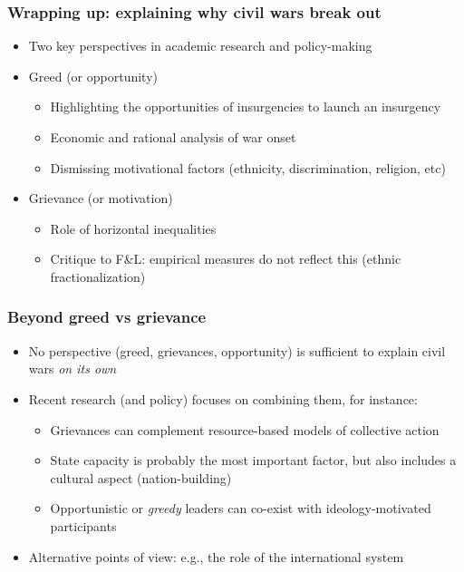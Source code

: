 \documentclass[utf8, xcolor=dvipsnames]{beamer}
\begin{document}
\begin{frame}
\frametitle{Wrapping up: explaining why civil wars break out}
\centering

\begin{itemize}
  \item<1-> Two key perspectives in academic research and policy-making
  \item<2-> Greed (or opportunity)
    \begin{itemize}
      \item Highlighting the opportunities of insurgencies to launch an insurgency
      \item Economic and rational analysis of war onset
      \item Dismissing motivational factors (ethnicity, discrimination, religion, etc)
    \end{itemize}
  \item<3-> Grievance (or motivation)
  \begin{itemize}
    \item Role of horizontal inequalities
    \item Critique to F\&L: empirical measures do not reflect this (ethnic fractionalization)
  \end{itemize}
\end{itemize}

\end{frame}

\begin{frame}
\frametitle{Beyond greed vs grievance}
\centering

\begin{itemize}[<+->]
  \item No perspective (greed, grievances, opportunity) is sufficient to explain civil wars \textit{on its own}
  \item Recent research (and policy) focuses on combining them, for instance:
  \begin{itemize}
    \item Grievances can complement resource-based models of collective action
    \item State capacity is probably the most important factor, but also includes a cultural aspect (nation-building)
    \item Opportunistic or \textit{greedy} leaders can co-exist with ideology-motivated participants
  \end{itemize}
  \item Alternative points of view: e.g., the role of the international system
\end{itemize}

\end{frame}
\end{document}
